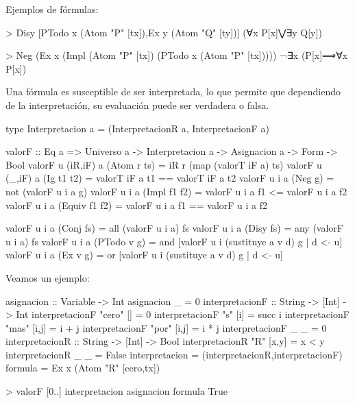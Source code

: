 \documentclass{beamer}
\begin{document}
\begin{frame}[fragile]
  Ejemplos de fórmulas:

  \vspace{5mm}
\begin{sesion}
> Disy [PTodo x (Atom "P" [tx]),Ex y (Atom "Q" [ty])]
(∀x P[x]⋁∃y Q[y])


> Neg (Ex x (Impl (Atom "P" [tx]) (PTodo x (Atom "P" [tx]))))
¬∃x (P[x]⟹∀x P[x])
\end{sesion}
\end{frame}

\begin{frame}
 Una fórmula es susceptible de ser interpretada, lo que permite que dependiendo de la interpretación, su evaluación puede ser verdadera o falsa. 
\end{frame}

\begin{frame}[fragile]
\begin{code}
type Interpretacion a =
      (InterpretacionR a, InterpretacionF a)  
\end{code}

\begin{code}
valorF :: Eq a => Universo a -> Interpretacion a
             -> Asignacion a -> Form -> Bool
valorF u (iR,iF) a (Atom r ts) =   
    iR r (map (valorT iF a) ts)
valorF u (_,iF) a (Ig t1 t2)   =   
    valorT iF a t1 == valorT iF a t2
valorF u i a (Neg g)           =  
    not (valorF u i a g)
valorF u i a (Impl f1 f2)      =  
    valorF u i a f1 <= valorF u i a f2
valorF u i a (Equiv f1 f2)     =  
    valorF u i a f1 == valorF u i a f2
\end{code}  
\end{frame}


\begin{frame}[fragile]
\begin{code}
valorF u i a (Conj fs)   =
    all (valorF u i a) fs
valorF u i a (Disy fs)   =  
    any (valorF u i a) fs
valorF u i a (PTodo v g) = 
    and [valorF u i (sustituye a v d) g | d <- u]
valorF u i a (Ex v g)    = 
    or  [valorF u i (sustituye a v d) g | d <- u]    
\end{code}
\end{frame}

\begin{frame}[fragile]
Veamos un ejemplo:
\begin{code}  
asignacion :: Variable -> Int
asignacion _ = 0
interpretacionF :: String -> [Int] -> Int
interpretacionF "cero" []    = 0
interpretacionF "s"    [i]   = succ i
interpretacionF "mas"  [i,j] = i + j
interpretacionF "por"  [i,j] = i * j
interpretacionF _ _          = 0
interpretacionR :: String -> [Int] -> Bool
interpretacionR "R" [x,y] = x < y  
interpretacionR _ _       = False
interpretacion = (interpretacionR,interpretacionF)
formula = Ex x (Atom "R" [cero,tx])
\end{code}
\begin{sesion}
  
> valorF [0..] interpretacion asignacion formula
True
\end{sesion}
\end{frame}
\end{document}
